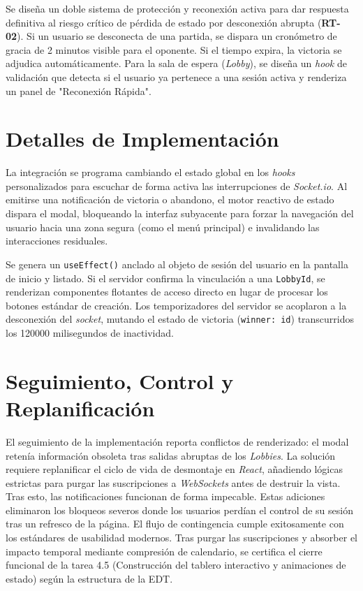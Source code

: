 Se diseña un doble sistema de protección y reconexión activa para dar respuesta definitiva al riesgo crítico de pérdida de estado por desconexión abrupta (\textbf{RT-02}). Si un usuario se desconecta de una partida, se dispara un cronómetro de gracia de 2 minutos visible para el oponente. Si el tiempo expira, la victoria se adjudica automáticamente. Para la sala de espera (\textit{Lobby}), se diseña un \textit{hook} de validación que detecta si el usuario ya pertenece a una sesión activa y renderiza un panel de "Reconexión Rápida".

\section{Detalles de Implementación}
La integración se programa cambiando el estado global en los \textit{hooks} personalizados para escuchar de forma activa las interrupciones de \textit{Socket.io}. Al emitirse una notificación de victoria o abandono, el motor reactivo de estado dispara el modal, bloqueando la interfaz subyacente para forzar la navegación del usuario hacia una zona segura (como el menú principal) e invalidando las interacciones residuales.

Se genera un \texttt{useEffect()} anclado al objeto de sesión del usuario en la pantalla de inicio y listado. Si el servidor confirma la vinculación a una \texttt{LobbyId}, se renderizan componentes flotantes de acceso directo en lugar de procesar los botones estándar de creación. Los temporizadores del servidor se acoplaron a la desconexión del \textit{socket}, mutando el estado de victoria (\texttt{winner: id}) transcurridos los 120000 milisegundos de inactividad.

\section{Seguimiento, Control y Replanificación}
El seguimiento de la implementación reporta conflictos de renderizado: el modal retenía información obsoleta tras salidas abruptas de los \textit{Lobbies}. La solución requiere replanificar el ciclo de vida de desmontaje en \textit{React}, añadiendo lógicas estrictas para purgar las suscripciones a \textit{WebSockets} antes de destruir la vista. Tras esto, las notificaciones funcionan de forma impecable. Estas adiciones eliminaron los bloqueos severos donde los usuarios perdían el control de su sesión tras un refresco de la página. El flujo de contingencia cumple exitosamente con los estándares de usabilidad modernos. Tras purgar las suscripciones y absorber el impacto temporal mediante compresión de calendario, se certifica el cierre funcional de la tarea 4.5 (Construcción del tablero interactivo y animaciones de estado) según la estructura de la EDT.


